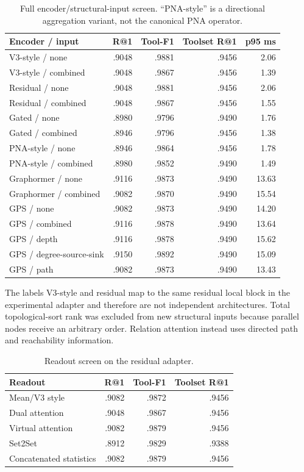 \documentclass{article}
\begin{document}
\begin{table}[h]
\caption{Full encoder/structural-input screen. ``PNA-style'' is a directional aggregation variant, not the canonical PNA operator.}
\centering
\scriptsize
\begin{tabular}{lrrrr}
\toprule
Encoder / input & R@1 & Tool-F1 & Toolset R@1 & p95 ms \\
\midrule
V3-style / none & .9048 & .9881 & .9456 & 2.06 \\
V3-style / combined & .9048 & .9867 & .9456 & 1.39 \\
Residual / none & .9048 & .9881 & .9456 & 2.06 \\
Residual / combined & .9048 & .9867 & .9456 & 1.55 \\
Gated / none & .8980 & .9796 & .9490 & 1.76 \\
Gated / combined & .8946 & .9796 & .9456 & 1.38 \\
PNA-style / none & .8946 & .9864 & .9456 & 1.78 \\
PNA-style / combined & .8980 & .9852 & .9490 & 1.49 \\
Graphormer / none & .9116 & .9873 & .9490 & 13.63 \\
Graphormer / combined & .9082 & .9870 & .9490 & 15.54 \\
GPS / none & .9082 & .9873 & .9490 & 14.20 \\
GPS / combined & .9116 & .9878 & .9490 & 13.64 \\
GPS / depth & .9116 & .9878 & .9490 & 15.62 \\
GPS / degree-source-sink & .9150 & .9892 & .9490 & 15.09 \\
GPS / path & .9082 & .9873 & .9490 & 13.43 \\
\bottomrule
\end{tabular}
\end{table}

The labels V3-style and residual map to the same residual local block in the experimental adapter and therefore are not independent architectures.
Total topological-sort rank was excluded from new structural inputs because parallel nodes receive an arbitrary order.
Relation attention instead uses directed path and reachability information.

\begin{table}[h]
\caption{Readout screen on the residual adapter.}
\centering
\small
\begin{tabular}{lrrr}
\toprule
Readout & R@1 & Tool-F1 & Toolset R@1 \\
\midrule
Mean/V3 style & .9082 & .9872 & .9456 \\
Dual attention & .9048 & .9867 & .9456 \\
Virtual attention & .9082 & .9879 & .9456 \\
Set2Set & .8912 & .9829 & .9388 \\
Concatenated statistics & .9082 & .9879 & .9456 \\
\bottomrule
\end{tabular}
\end{table}
\end{document}

